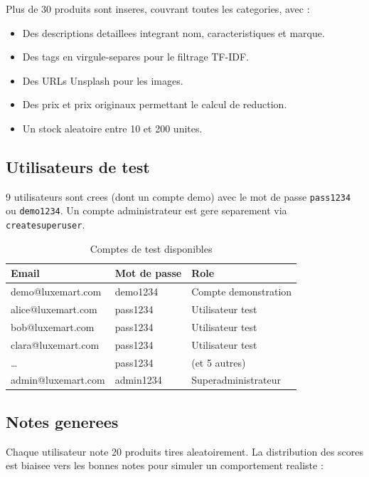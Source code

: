\documentclass[12pt,a4paper]{report}
\begin{document}
Plus de 30 produits sont inseres, couvrant toutes les categories, avec :
\begin{itemize}
  \item Des descriptions detaillees integrant nom, caracteristiques et marque.
  \item Des tags en virgule-separes pour le filtrage TF-IDF.
  \item Des URLs Unsplash pour les images.
  \item Des prix et prix originaux permettant le calcul de reduction.
  \item Un stock aleatoire entre 10 et 200 unites.
\end{itemize}

\subsection{Utilisateurs de test}

9 utilisateurs sont crees (dont un compte demo) avec le mot de passe
\texttt{pass1234} ou \texttt{demo1234}. Un compte administrateur est gere
separement via \texttt{createsuperuser}.

\begin{table}[h]
\centering
\begin{tabular}{@{}lll@{}}
\toprule
\textbf{Email} & \textbf{Mot de passe} & \textbf{Role} \\
\midrule
demo@luxemart.com  & demo1234  & Compte demonstration \\
alice@luxemart.com & pass1234  & Utilisateur test \\
bob@luxemart.com   & pass1234  & Utilisateur test \\
clara@luxemart.com & pass1234  & Utilisateur test \\
\ldots             & pass1234  & (et 5 autres) \\
admin@luxemart.com & admin1234 & Superadministrateur \\
\bottomrule
\end{tabular}
\caption{Comptes de test disponibles}
\end{table}

\subsection{Notes generees}

Chaque utilisateur note 20 produits tires aleatoirement. La distribution des
scores est biaisee vers les bonnes notes pour simuler un comportement realiste :
\end{document}
